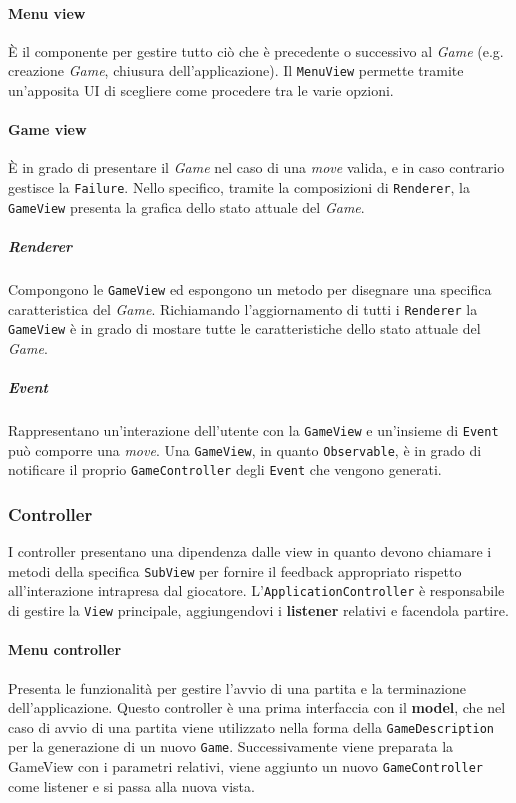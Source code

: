 \paragraph{Menu view} 
%
È il componente per gestire tutto ciò che è precedente o successivo al \textit{Game} (e.g. creazione \textit{Game}, chiusura dell'applicazione).
%
Il \texttt{MenuView} permette tramite un'apposita UI di scegliere come procedere tra le varie opzioni.
\paragraph{Game view} 
%
È in grado di presentare il \textit{Game} nel caso di una \textit{move} valida, e in caso contrario gestisce la \texttt{Failure}.
%
Nello specifico, tramite la composizioni di \texttt{Renderer}, la \texttt{GameView} presenta la grafica dello stato attuale del \textit{Game}.
\subparagraph{Renderer}
%
Compongono le \texttt{GameView} ed espongono un metodo per disegnare una specifica caratteristica del \textit{Game}.
%
Richiamando l'aggiornamento di tutti i \texttt{Renderer} la \texttt{GameView} è in grado di mostare tutte le caratteristiche dello stato attuale del \textit{Game}.
\subparagraph{Event}
%
Rappresentano un'interazione dell'utente con la \texttt{GameView} e un'insieme di \texttt{Event} può comporre una \textit{move}.
%
Una \texttt{GameView}, in quanto \texttt{Observable}, è in grado di notificare il proprio \texttt{GameController} degli \texttt{Event} che vengono generati. 
\subsubsection{Controller}
I controller presentano una dipendenza dalle view in quanto devono chiamare i metodi della specifica \texttt{SubView} per fornire il feedback appropriato rispetto all'interazione intrapresa dal giocatore.
%
L'\texttt{ApplicationController} è responsabile di gestire la \texttt{View} principale, aggiungendovi i \textbf{listener} relativi e facendola partire.
\paragraph{Menu controller}
%
Presenta le funzionalità per gestire l'avvio di una partita e la terminazione dell'applicazione.
%
Questo controller è una prima interfaccia con il \textbf{model}, che nel caso di avvio di una partita viene utilizzato nella forma della \texttt{GameDescription} per la generazione di un nuovo \texttt{Game}.
%
Successivamente viene preparata la GameView con i parametri relativi, viene aggiunto un nuovo \texttt{GameController} come listener e si passa alla nuova vista.
